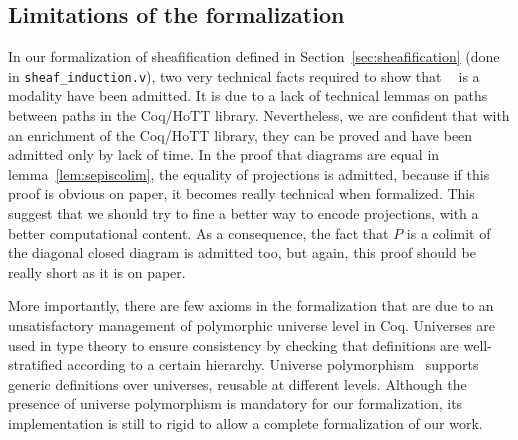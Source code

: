 \documentclass[conference]{IEEEtran}
\DeclareMathOperator{\IsHProp}{IsHProp}
\DeclareMathOperator{\id}{id}
\newcommand \separated {\mathop{\square_{n+1}} }
\begin{document}

\subsection{Limitations of the formalization}

In our formalization of sheafification defined in
Section~\ref{sec:sheafification} (done in 
\texttt{sheaf\_induction.v}), two very technical facts required to
show that $\separated$ is a modality have been
admitted. 
%
It is due to a lack of technical lemmas on paths between paths in
the Coq/HoTT library.
%
Nevertheless, we are confident that with an enrichment of the Coq/HoTT
library, they can be proved and have been admitted only by lack of
time.
%
In the proof that diagrams are equal in lemma~\ref{lem:sepiscolim},
the equality of projections is admitted, because if this proof is
obvious on paper, it becomes really technical when formalized.
%
This suggest that we should try to fine a better way to encode
projections, with a better computational content.
%
As a consequence, the fact that $P$ is a colimit of the diagonal
closed diagram is admitted too, but again, this proof should be really
short as it is on paper.

More importantly, there are few axioms in the formalization that are
due to an unsatisfactory management of polymorphic universe level in
Coq.
%
Universes are used in type theory to ensure consistency by checking
that definitions are well-stratified according to a certain hierarchy.
%
Universe polymorphism~\cite{sozeau2014universe} supports generic
definitions over universes, reusable at different levels.
%
Although the presence of universe polymorphism is mandatory for our
formalization, its implementation is still to rigid to allow a
complete formalization of our work.
\end{document}
